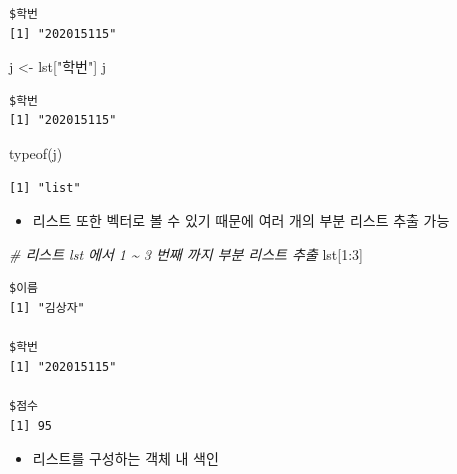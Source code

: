\documentclass[
  11pt,
]{krantz}
\newenvironment{Shaded}{\begin{snugshade}}{\end{snugshade}}
\newcommand{\CommentTok}[1]{\textcolor[rgb]{0.37,0.37,0.37}{\textit{#1}}}
\newcommand{\DecValTok}[1]{\textcolor[rgb]{0.06,0.06,0.06}{#1}}
\newcommand{\FunctionTok}[1]{\textcolor[rgb]{0,0,0}{#1}}
\newcommand{\NormalTok}[1]{#1}
\newcommand{\OtherTok}[1]{\textcolor[rgb]{0.37,0.37,0.37}{#1}}
\newcommand{\SpecialCharTok}[1]{\textcolor[rgb]{0,0,0}{#1}}
\newcommand{\StringTok}[1]{\textcolor[rgb]{0.5,0.5,0.5}{#1}}
\providecommand{\tightlist}{%
  \setlength{\itemsep}{0pt}\setlength{\parskip}{0pt}}
\begin{document}
\begin{verbatim}
$학번
[1] "202015115"
\end{verbatim}

\begin{Shaded}
\begin{Highlighting}[]
\NormalTok{j }\OtherTok{\textless{}{-}}\NormalTok{ lst[}\StringTok{"학번"}\NormalTok{]}
\NormalTok{j}
\end{Highlighting}
\end{Shaded}

\begin{verbatim}
$학번
[1] "202015115"
\end{verbatim}

\begin{Shaded}
\begin{Highlighting}[]
\FunctionTok{typeof}\NormalTok{(j)}
\end{Highlighting}
\end{Shaded}

\begin{verbatim}
[1] "list"
\end{verbatim}

\normalsize

\begin{itemize}
\tightlist
\item
  리스트 또한 벡터로 볼 수 있기 때문에 여러 개의 부분 리스트 추출 가능
\end{itemize}

\footnotesize

\begin{Shaded}
\begin{Highlighting}[]
\CommentTok{\# 리스트 lst 에서 1 \textasciitilde{} 3 번째 까지 부분 리스트 추출}
\NormalTok{lst[}\DecValTok{1}\SpecialCharTok{:}\DecValTok{3}\NormalTok{]}
\end{Highlighting}
\end{Shaded}

\begin{verbatim}
$이름
[1] "김상자"

$학번
[1] "202015115"

$점수
[1] 95
\end{verbatim}

\normalsize

\begin{itemize}
\tightlist
\item
  리스트를 구성하는 객체 내 색인
\end{itemize}

\footnotesize
\end{document}

